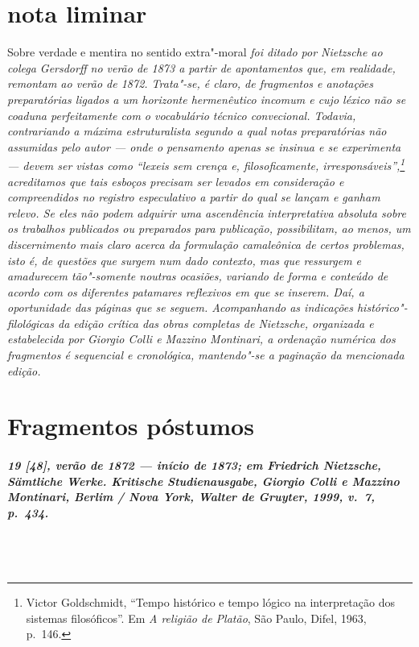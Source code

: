 \chapter*{nota liminar}

\noindent Sobre verdade e mentira no sentido extra"-moral {\itshape foi ditado por
Nietzsche ao colega Gersdorff no verão de 1873 a partir de apontamentos
que, em realidade, remontam ao verão de 1872. Trata"-se, é claro, de
fragmentos e anotações preparatórias ligados a um horizonte
hermenêutico incomum e cujo léxico não se coaduna perfeitamente 
com o vocabulário técnico convecional. Todavia, contrariando a máxima
estruturalista segundo a qual notas preparatórias não assumidas pelo
autor --- onde o pensamento apenas se insinua e se experimenta ---
devem ser vistas como “\emph{lexeis} sem
crença e, \emph{filosoficamente}, irresponsáveis”,\footnote{
Victor Goldschmidt, “Tempo histórico e tempo lógico na interpretação
dos sistemas filosóficos”. Em \textit{A religião de Platão}, São
Paulo, Difel, 1963, p.~146.} acreditamos que tais esboços precisam ser
levados em consideração e compreendidos no registro especulativo a
partir do qual se lançam e ganham relevo. Se eles não podem adquirir
uma ascendência interpretativa absoluta sobre os trabalhos publicados
ou preparados para publicação, possibilitam, ao menos, um
discernimento mais claro acerca da formulação camaleônica de certos
problemas, isto é, de questões que surgem num dado contexto, mas que
ressurgem e amadurecem tão"-somente noutras ocasiões, variando de
forma e conteúdo de acordo com os diferentes patamares reflexivos em
que se inserem. Daí, a oportunidade das páginas que se seguem.
Acompanhando as indicações histórico"-filológicas da edição crítica
das obras completas de Nietzsche, organizada e estabelecida por Giorgio
Colli e Mazzino Montinari, a ordenação numérica dos fragmentos é
sequencial e cronológica, mantendo"-se a paginação da mencionada
edição.  }
\pagebreak

\chapter*{Fragmentos póstumos}

\paragraph*{19 [48], verão de 1872 --- início de 1873; em Friedrich Nietzsche, 
\textit{Sämtliche Werke. Kritische Studienausgabe}, Giorgio Colli e
Mazzino Montinari, Berlim / Nova York, Walter de Gruyter, 1999, v.~7, p.~434.}
\ \\
\ \\

